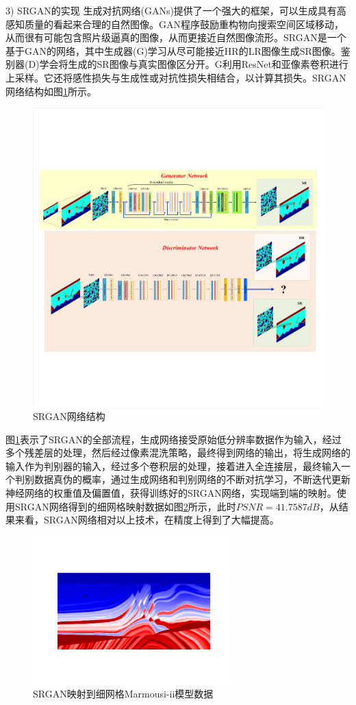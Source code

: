 \documentclass[11pt]{article}
\begin{document}
\par
3) SRGAN的实现
生成对抗网络(GANs)提供了一个强大的框架，可以生成具有高感知质量的看起来合理的自然图像。GAN程序鼓励重构物向搜索空间区域移动，从而很有可能包含照片级逼真的图像，从而更接近自然图像流形。SRGAN是一个基于GAN的网络，其中生成器(G)学习从尽可能接近HR的LR图像生成SR图像。鉴别器(D)学会将生成的SR图像与真实图像区分开。G利用ResNet和亚像素卷积进行上采样。它还将感性损失与生成性或对抗性损失相结合，以计算其损失。SRGAN网络结构如图\ref{Fig_SRGAN}所示。
\begin{figure}[htbp]
\centering
\includegraphics[width=5.5in]{./FigureFolder/Foundation/SuperResolution/GAN/SRGAN.pdf}
\caption{SRGAN网络结构}
\label{Fig_SRGAN}
\end{figure}
\par
图\ref{Fig_SRGAN}表示了SRGAN的全部流程，生成网络接受原始低分辨率数据作为输入，经过多个残差层的处理，然后经过像素混洗策略，最终得到网络的输出，将生成网络的输入作为判别器的输入，经过多个卷积层的处理，接着进入全连接层，最终输入一个判别数据真伪的概率，通过生成网络和判别网络的不断对抗学习，不断迭代更新神经网络的权重值及偏置值，获得训练好的SRGAN网络，实现端到端的映射。使用SRGAN网络得到的细网格映射数据如图\ref{Fig_HRSRGAN}所示，此时$PSNR=41.7587dB$，从结果来看，SRGAN网络相对以上技术，在精度上得到了大幅提高。
\begin{figure}[htbp]
\centering
\includegraphics[width=3in]{./FigureFolder/Foundation/SuperResolution/GAN/HR_Marmousi.pdf}
\caption{SRGAN映射到细网格Marmousi-ii模型数据}
\label{Fig_HRSRGAN}
\end{figure}
\end{document}
